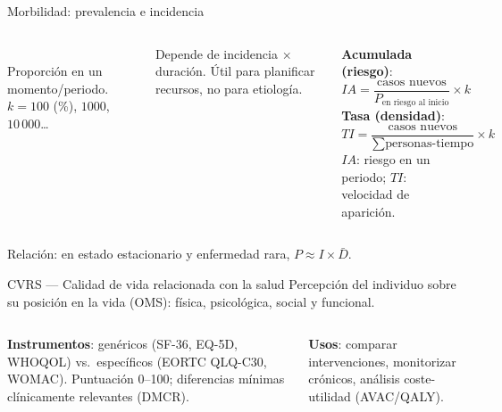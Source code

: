 \documentclass[aspectratio=169,8pt]{beamer}
\begin{document}
\begin{frame}{Morbilidad: prevalencia e incidencia}
  \begin{columns}[T,onlytextwidth]
      \begin{tcolorbox}[formulabox,title=Prevalencia --- foto fija]
        \\[3pt]
        \footnotesize Proporci\'on en un momento/periodo.\quad $k=100$ (\%), $1000$, $10\,000$\ldots
      \end{tcolorbox}
      \vspace{0.3em}
      {\scriptsize Depende de incidencia $\times$ duraci\'on. \'Util para planificar recursos, no para etiolog\'ia.}
      \begin{tcolorbox}[tealbox,title=Incidencia --- pel\'icula]
        \footnotesize
        \textbf{Acumulada (riesgo)}: $IA=\dfrac{\text{casos nuevos}}{P_{\text{en riesgo al inicio}}}\times k$\\[3pt]
        \textbf{Tasa (densidad)}: $TI=\dfrac{\text{casos nuevos}}{\sum\text{personas-tiempo}}\times k$\\[3pt]
        {\scriptsize $IA$: riesgo en un periodo; $TI$: velocidad de aparici\'on.}
      \end{tcolorbox}
    \end{columns}
    \vspace{0.3em}
    {\scriptsize\color{neutral}Relaci\'on: en estado estacionario y enfermedad rara, $P \approx I\times \bar D$.}
\end{frame}

\begin{frame}{CVRS --- Calidad de vida relacionada con la salud}
  \small Percepci\'on del individuo sobre su posici\'on en la vida (OMS): f\'isica, psicol\'ogica, social y funcional.
  \vspace{0.3em}
  \begin{columns}[T,onlytextwidth]
      \begin{tcolorbox}[infobox]
        \footnotesize
        \textbf{Instrumentos}: gen\'ericos (SF-36, EQ-5D, WHOQOL) vs.\ espec\'ificos (EORTC QLQ-C30, WOMAC). Puntuaci\'on 0--100; diferencias m\'inimas cl\'inicamente relevantes (DMCR).
      \end{tcolorbox}
      \begin{tcolorbox}[amberbox]
        \footnotesize\textbf{Usos}: comparar intervenciones, monitorizar cr\'onicos, an\'alisis coste-utilidad (AVAC/QALY).
      \end{tcolorbox}
  \end{columns}
\end{frame}
\end{document}
